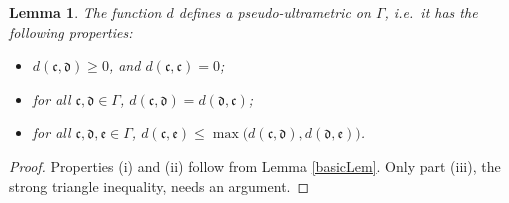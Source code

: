 \documentclass[twoside,11pt,letter]{article}
\def\fc{{\mathfrak{c}}}
\def\fd{{\mathfrak{d}}}
\def\fe{{\mathfrak{e}}}
\theoremstyle{definition}
\theoremstyle{definition}
\theoremstyle{plain}
\newtheorem{lemma}[theorem]{Lemma}
\begin{document}
\begin{lemma}\label{ultraLem}
The function $d$ defines a pseudo-ultrametric on $\Gamma$, i.e.\ it has the following properties:
\begin{itemize}
\item[(i)]{$d(\fc,\fd)\geq 0$, and $d(\fc,\fc)=0$;}
\item[(ii)]{for all $\fc,\fd\in\Gamma$, $d(\fc,\fd)=d(\fd,\fc)$;}
\item[(iii)]{for all $\fc,\fd,\fe\in\Gamma$, $d(\fc,\fe)\leq \max\big(d(\fc,\fd),d(\fd,\fe)\big)$.}
\end{itemize}
\end{lemma}
\begin{proof}
Properties (i) and (ii) follow from Lemma \ref{basicLem}. Only part (iii), the strong triangle inequality, needs an argument.


\end{proof}
\end{document}
